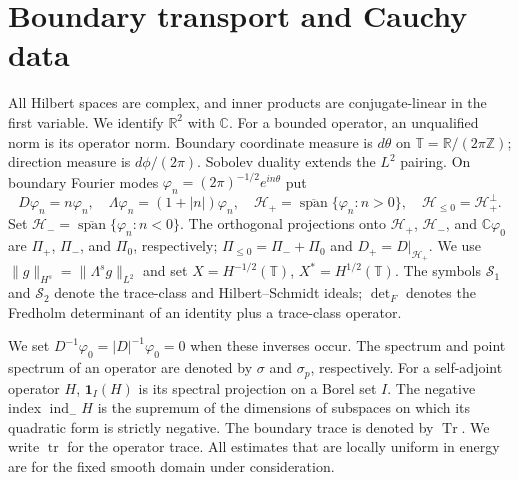 \documentclass[11pt]{amsart}
\numberwithin{equation}{section}
\newcommand{\T}{\mathbb T}
\newcommand{\tr}{\operatorname{tr}}
\newcommand{\indm}{\operatorname{ind}_{-}}
\newcommand{\norm}[1]{\lVert #1\rVert}
\newcommand{\ph}{\varphi}
\begin{document}
\section{Boundary transport and Cauchy data}\label{sec:transport}

All Hilbert spaces are complex, and inner products are conjugate-linear
in the first variable. We identify $\mathbb R^2$ with $\mathbb C$.
For a bounded operator, an unqualified norm is its operator norm.
Boundary coordinate measure is $d\theta$ on $\T=\mathbb R/(2\pi\mathbb Z)$;
direction measure is $d\phi/(2\pi)$. Sobolev duality extends the $L^2$
pairing. On boundary Fourier modes $\ph_n=(2\pi)^{-1/2}e^{in\theta}$ put
\[
 D\ph_n=n\ph_n,\quad \Lambda\ph_n=(1+|n|)\ph_n,
 \quad \mathcal H_+=\overline{\operatorname{span}}\{\ph_n:n>0\},
 \quad \mathcal H_{\le0}=\mathcal H_+^\perp.
\]
Set $\mathcal H_-=\overline{\operatorname{span}}\{\ph_n:n<0\}$.
The orthogonal projections onto $\mathcal H_+$, $\mathcal H_-$, and
$\mathbb C\ph_0$ are $\Pi_+$, $\Pi_-$, and $\Pi_0$, respectively;
$\Pi_{\le0}=\Pi_-+\Pi_0$ and $D_+=D|_{\mathcal H_+}$.
We use $\norm{g}_{H^s}=\norm{\Lambda^s g}_{L^2}$ and set
$X=H^{-1/2}(\T)$, $X^*=H^{1/2}(\T)$. The symbols $\mathcal S_1$
and $\mathcal S_2$ denote the trace-class and Hilbert--Schmidt ideals;
$\det_F$ denotes the Fredholm determinant of an identity plus a
trace-class operator.

We set $D^{-1}\ph_0=|D|^{-1}\ph_0=0$ when these inverses occur.
The spectrum and point spectrum of an operator are denoted by $\sigma$
and $\sigma_p$, respectively. For a self-adjoint operator $H$,
$\mathbf1_I(H)$ is its spectral projection on a Borel set $I$.
The negative index $\indm H$ is the supremum of the dimensions of
subspaces on which its quadratic form is strictly negative.
The boundary trace is denoted by $\operatorname{Tr}$.
We write $\tr$ for the operator trace. All estimates that are locally
uniform in energy are for the fixed smooth domain under consideration.
\end{document}
